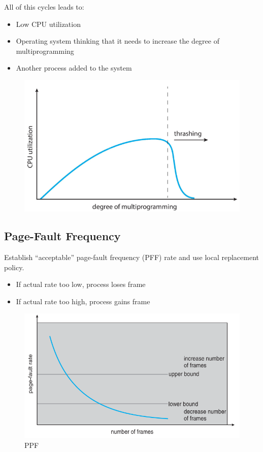 All of this cycles leads to:

\begin{itemize}
    \item Low CPU utilization
    \item Operating system thinking that it needs to increase the degree of multiprogramming
    \item Another process added to the system
\end{itemize}

\begin{figure}[htbp]
    \centering
    \includegraphics[width=0.5\linewidth]{img/SDBF.png}
\end{figure}

\subsection{Page-Fault Frequency}

Establish “acceptable” page-fault frequency (PFF) rate and use local replacement policy.

\begin{itemize}
    \item[] If actual rate too low, process loses frame
    \item[] If actual rate too high, process gains frame
\end{itemize}

\begin{figure}[htbp]
    \centering
    \includegraphics[width=0.5\linewidth]{img/fmh.png}
    \caption{PPF}
\end{figure}
















